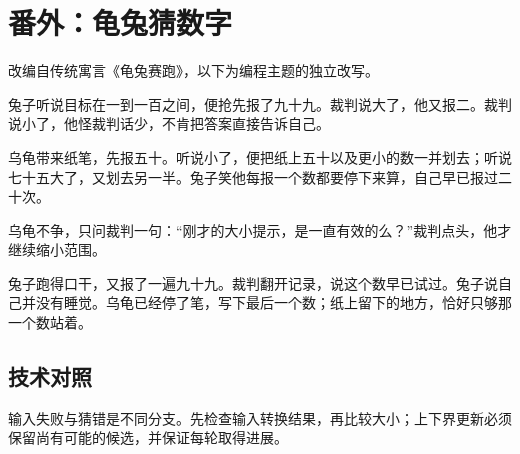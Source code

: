 \section{番外：龟兔猜数字}

改编自传统寓言《龟兔赛跑》，以下为编程主题的独立改写。

兔子听说目标在一到一百之间，便抢先报了九十九。裁判说大了，他又报二。裁判说小了，他怪裁判话少，不肯把答案直接告诉自己。

乌龟带来纸笔，先报五十。听说小了，便把纸上五十以及更小的数一并划去；听说七十五大了，又划去另一半。兔子笑他每报一个数都要停下来算，自己早已报过二十次。

乌龟不争，只问裁判一句：“刚才的大小提示，是一直有效的么？”裁判点头，他才继续缩小范围。

兔子跑得口干，又报了一遍九十九。裁判翻开记录，说这个数早已试过。兔子说自己并没有睡觉。乌龟已经停了笔，写下最后一个数；纸上留下的地方，恰好只够那一个数站着。

\subsection*{技术对照}

输入失败与猜错是不同分支。先检查输入转换结果，再比较大小；上下界更新必须保留尚有可能的候选，并保证每轮取得进展。
